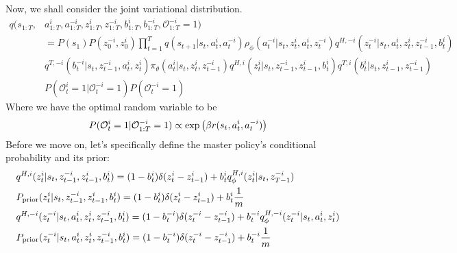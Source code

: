 Now, we shall consider the joint variational distribution. 
\begin{equation}
\begin{aligned}
    q(s_{1:T}, &a^i_{1:T}, a^{-i}_{1:T}, z^i_{1:T}, z^{-i}_{1:T}, b^i_{1:T}, b^{-i}_{1:T}, \mathcal{O}^{-i}_{1:T} = 1) \\
    &= P(s_1)P(z^{-i}_0, z^i_0)\prod^T_{t=1} q(s_{t+1} | s_t, a_t^i, a_t^{-i})\rho_\phi(a^{-i}_t | s_t, z^i_t, a^i_t, z^{-i}_t) q^{H,-i}(z^{-i}_t | s_t, a^i_t, z^i_t, z^{-i}_{t-1}, b^i_t) \\
    &q^{T,-i}(b^{-i}_t | s_t,  z^{-i}_{t-1}, a^i_t, z^i_t) \pi_\theta(a^i_t | s_t, z^i_t, z^{-i}_{t-1}) q^{H,i}(z^i_t | s_t, z^{-i}_{t-1}, z^i_{t-1}, b^i_t) q^{T,i}(b^i_t | s_t, z^i_{t-1}, z^{-i}_{t-1})\\
    &P(\mathcal{O}^i_t = 1 | \mathcal{O}^{-i}_t = 1)P(\mathcal{O}^{-i}_t = 1)
\end{aligned}
\end{equation}
Where we have the optimal random variable to be 
\begin{equation}
    P(\mathcal{O}^i_t = 1 | \mathcal{O}^{-i}_{1:T} = 1) \propto \exp\left( \beta r(s_t, a_t^i, a^{-i}_t) \right)
\end{equation}
Before we move on, let's specifically define the master policy's conditional probability and its prior:
\begin{equation}
\begin{aligned}
    &q^{H, i}(z^i_t | s_t, z^{-i}_{t-1}, z^i_{t-1}, b^i_t) = (1-b_t^i) \delta(z_t^i  - z_{t-1}^i) + b_t^i q^{H, i}_{\phi}(z_t^i | s_t, z^{-i}_{T-1}) \\
    &P_{\text{prior}}(z^i_t | s_t, z^{-i}_{t-1}, z^i_{t-1}, b^i_t) = (1-b_t^i) \delta(z_t^i  - z_{t-1}^i) + b_t^i \frac{1}{m} \\
    &q^{H, -i}(z^{-i}_t | s_t, a^i_t, z^i_t, z^{-i}_{t-1}, b^i_t) = (1-b_t^{-i}) \delta(z_t^{-i}  - z_{t-1}^{-i}) + b_t^{-i} q^{H, -i}_{\phi}(z_t^{-i} | s_t, a^i_t, z^i_t) \\
    &P_{\text{prior}}(z^{-i}_t | s_t, a^i_t, z^i_t, z^{-i}_{t-1}, b^i_t) = (1-b_t^{-i}) \delta(z_t^{-i}  - z_{t-1}^{-i}) + b_t^{-i} \frac{1}{m} \\
\end{aligned}
\end{equation}
